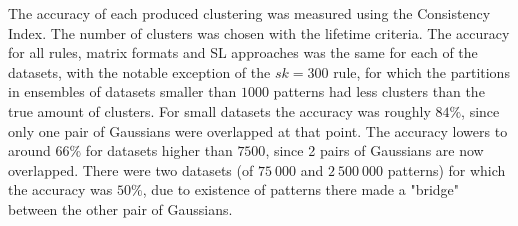 The accuracy of each produced clustering was measured using the Consistency Index.
The number of clusters was chosen with the lifetime criteria.
The accuracy for all rules, matrix formats and SL approaches was the same for each of the datasets, with the notable exception of the $sk=300$ rule, for which the partitions in ensembles of datasets smaller than $1000$ patterns had less clusters than the true amount of clusters.
For small datasets the accuracy was roughly $84\%$, since only one pair of Gaussians were overlapped at that point.
The accuracy lowers to around $66\%$ for datasets higher than $7500$, since 2 pairs of Gaussians are now overlapped.
There were two datasets (of $75 \: 000$ and $2 \: 500 \: 000$ patterns) for which the accuracy was $50\%$, due to existence of patterns there made a "bridge" between the other pair of Gaussians.






